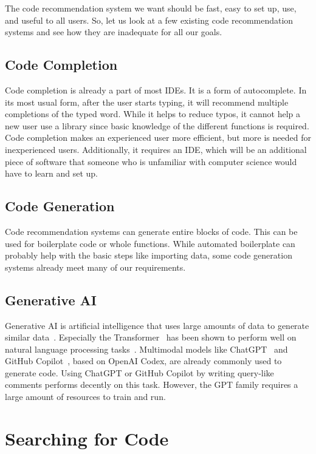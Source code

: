 \documentclass[
     12pt,                    %
     a4paper,             %
     BCOR=10mm,     %
     DIV=14,                 %
     listof=totoc,                    %
     bibliography=totoc,       %
     index=totoc,              %
     twoside,
     headsepline
     ]{scrreprt}
\begin{document}
The code recommendation system we want should be fast, easy to set up, use, and useful to all users.
So, let us look at a few existing code recommendation systems and see how they are inadequate for all our goals.

\subsection{Code Completion}

Code completion is already a part of most IDEs. It is a form of autocomplete. In its most usual form, after the user starts typing, it will recommend multiple completions of the typed word. While it helps to reduce typos, it cannot help a new user use a library since basic knowledge of the different functions is required. Code completion makes an experienced user more efficient, but more is needed for inexperienced users. Additionally, it requires an IDE, which will be an additional piece of software that someone who is unfamiliar with computer science would have to learn and set up.

\subsection{Code Generation}

Code recommendation systems can generate entire blocks of code. This can be used for boilerplate code or whole functions. While automated boilerplate can probably help with the basic steps like importing data, some code generation systems already meet many of our requirements.

\subsection{Generative AI}

Generative AI is artificial intelligence that uses large amounts of data to generate similar data~\cite{generativemodels}.
Especially the Transformer~\cite{vaswani2017attention} has been shown to perform well on natural language processing tasks~\cite{radford2018improving}. Multimodal models like ChatGPT~\cite{chatgpt} and GitHub Copilot~\cite{copilot}, based on OpenAI Codex, are already commonly used to generate code. Using ChatGPT or GitHub Copilot by writing query-like comments performs decently on this task. However, the GPT family requires a large amount of resources to train and run.

\section{Searching for Code}
\end{document}
